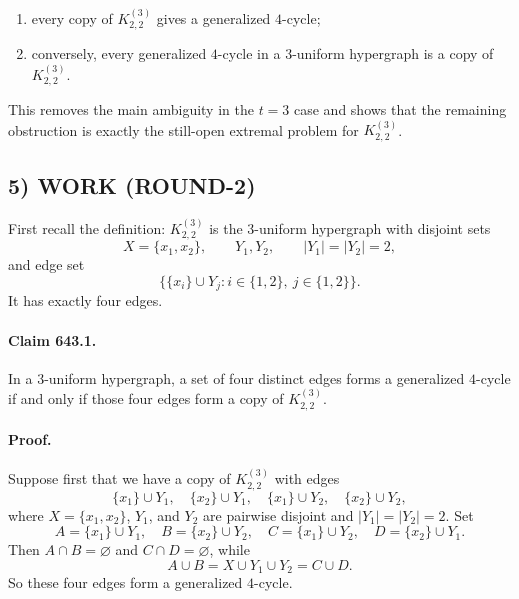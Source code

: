 \begin{enumerate}
\item every copy of $K^{(3)}_{2,2}$ gives a generalized $4$-cycle;
\item conversely, every generalized $4$-cycle in a $3$-uniform hypergraph is a copy of $K^{(3)}_{2,2}$.
\end{enumerate}

This removes the main ambiguity in the $t=3$ case and shows that the remaining obstruction is exactly the still-open extremal problem for $K^{(3)}_{2,2}$.

\subsection*{5) WORK (ROUND-2)}
First recall the definition: $K^{(3)}_{2,2}$ is the $3$-uniform hypergraph with disjoint sets
\[
X=\{x_1,x_2\},
\qquad
Y_1, Y_2,
\qquad
|Y_1|=|Y_2|=2,
\]
and edge set
\[
\{\{x_i\}\cup Y_j : i\in\{1,2\},\ j\in\{1,2\}\}.
\]
It has exactly four edges.

\paragraph{Claim 643.1.}
In a $3$-uniform hypergraph, a set of four distinct edges forms a generalized $4$-cycle if and only if those four edges form a copy of $K^{(3)}_{2,2}$.

\paragraph{Proof.}
Suppose first that we have a copy of $K^{(3)}_{2,2}$ with edges
\[
\{x_1\}\cup Y_1,
\quad
\{x_2\}\cup Y_1,
\quad
\{x_1\}\cup Y_2,
\quad
\{x_2\}\cup Y_2,
\]
where $X=\{x_1,x_2\}$, $Y_1$, and $Y_2$ are pairwise disjoint and $|Y_1|=|Y_2|=2$.
Set
\[
A=\{x_1\}\cup Y_1,
\quad
B=\{x_2\}\cup Y_2,
\quad
C=\{x_1\}\cup Y_2,
\quad
D=\{x_2\}\cup Y_1.
\]
Then $A\cap B=\varnothing$ and $C\cap D=\varnothing$, while
\[
A\cup B = X\cup Y_1\cup Y_2 = C\cup D.
\]
So these four edges form a generalized $4$-cycle.

